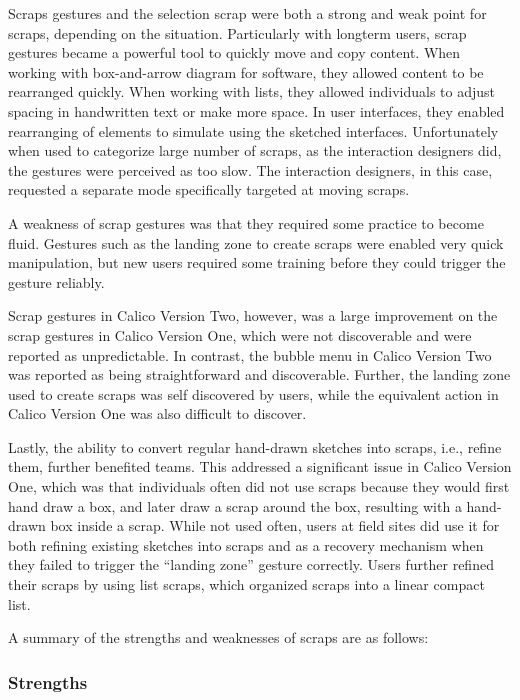 Scraps gestures and the selection scrap were both a strong and weak point for scraps, depending on the situation. Particularly with longterm users, scrap gestures became a powerful tool to quickly move and copy content. When working with box-and-arrow diagram for software, they allowed content to be rearranged quickly. When working with lists, they allowed individuals to adjust spacing in handwritten text or make more space. In user interfaces, they enabled rearranging of elements to simulate using the sketched interfaces. Unfortunately when used to categorize large number of scraps, as the interaction designers did, the gestures were perceived as too slow. The interaction designers, in this case, requested a separate mode specifically targeted at moving scraps.

A weakness of scrap gestures was that they required some practice to become fluid. Gestures such as the landing zone to create scraps were enabled very quick manipulation, but new users required some training before they could trigger the gesture reliably. 

Scrap gestures in Calico Version Two, however, was a large improvement on the scrap gestures in Calico Version One, which were not discoverable and were reported as unpredictable. In contrast, the bubble menu in Calico Version Two was reported as being straightforward and discoverable. Further, the landing zone used to create scraps was self discovered by users, while the equivalent action in Calico Version One was also difficult to discover. 

Lastly, the ability to convert regular hand-drawn sketches into scraps, i.e., refine them, further benefited teams. This addressed a significant issue in Calico Version One, which was that individuals often did not use scraps because they would first hand draw a box, and later draw a scrap around the box, resulting with a hand-drawn box inside a scrap. While not used often, users at field sites did use it for both refining existing sketches into scraps and as a recovery mechanism when they failed to trigger the ``landing zone'' gesture correctly.  Users further refined their scraps by using list scraps, which organized scraps into a linear compact list. 

A summary of the strengths and weaknesses of scraps are as follows:

\subsubsection{Strengths}

